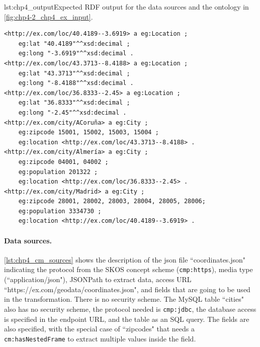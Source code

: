 \begin{captionedlisting}{lst:chp4_output}{Expected RDF output for the data sources and the ontology in \cref{fig:chp4-2_chp4_ex_input}.}
\centering
{\begin{lstlisting}[]
<http://ex.com/loc/40.4189--3.6919> a eg:Location ;
	eg:lat "40.4189"^^xsd:decimal ;
	eg:long "-3.6919"^^xsd:decimal .
<http://ex.com/loc/43.3713--8.4188> a eg:Location ;
	eg:lat "43.3713"^^xsd:decimal ;
	eg:long "-8.4188"^^xsd:decimal .
<http://ex.com/loc/36.8333--2.45> a eg:Location ;
	eg:lat "36.8333"^^xsd:decimal ;
	eg:long "-2.45"^^xsd:decimal .
<http://ex.com/city/ACoruña> a eg:City ;
	eg:zipcode 15001, 15002, 15003, 15004 ;
	eg:location <http://ex.com/loc/43.3713--8.4188> .
<http://ex.com/city/Almería> a eg:City ;
	eg:zipcode 04001, 04002 ;
	eg:population 201322 ;
	eg:location <http://ex.com/loc/36.8333--2.45> .
<http://ex.com/city/Madrid> a eg:City ;
	eg:zipcode 28001, 28002, 28003, 28004, 28005, 28006;
	eg:population 3334730 ;
	eg:location <http://ex.com/loc/40.4189--3.6919> .
\end{lstlisting}}
\end{captionedlisting}

\noindent\paragraph{\textbf{Data sources.}} \cref{lst:chp4_cm_sources} shows the description of the json file ``coordinates.json" indicating the protocol from the SKOS concept scheme (\texttt{cmp:https}), media type (``application/json"), JSONPath to extract data, access URL  ``https://ex.com/geodata/coordi\-nates.json", and  fields that are going to be used in the transformation. There is no security scheme. The MySQL table ``cities" also has no security scheme, the protocol needed is \texttt{cmp:jdbc}, the database access is specified in the endpoint URL, and the table as an SQL query. The fields are also specified, with the special case of ``zipcodes" that needs a \texttt{cm:hasNestedFrame} to extract multiple values inside the field.

